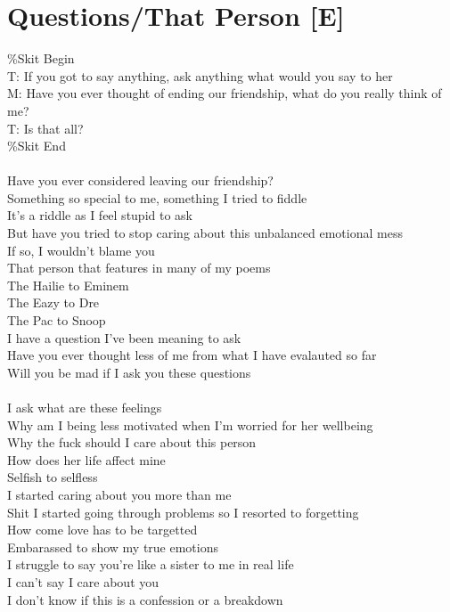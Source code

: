 \documentclass[12pt, b5paper, oneside]{book}
\begin{document}
\section{Questions/That Person [E]}
\%Skit Begin
\\T: If you got to say anything, ask anything what would you say to her
\\M: Have you ever thought of ending our friendship, what do you really think of me?
\\T: Is that all?
\\\%Skit End
%
\\\\Have you ever considered leaving our friendship? 
\\Something so special to me, something I tried to fiddle 
\\It's a riddle as I feel stupid to ask 
\\But have you tried to stop caring about this unbalanced emotional mess
\\If so, I wouldn't blame you
\\That person that features in many of my poems 
\\The Hailie to Eminem
\\The Eazy to Dre
\\The Pac to Snoop
\\I have a question I've been meaning to ask
\\Have you ever thought less of me from what I have evalauted so far
\\Will you be mad if I ask you these questions 
%
\\\\I ask what are these feelings 
\\Why am I being less motivated when I'm worried for her wellbeing 
\\Why the fuck should I care about this person 
\\How does her life affect mine 
\\Selfish to selfless 
\\I started caring about you more than me 
\\Shit I started going through problems so I resorted to forgetting 
\\How come love has to be targetted 
\\Embarassed to show my true emotions 
\\I struggle to say you're like a sister to me in real life 
\\I can't say I care about you 
\\I don't know if this is a confession or a breakdown 
\end{document}
